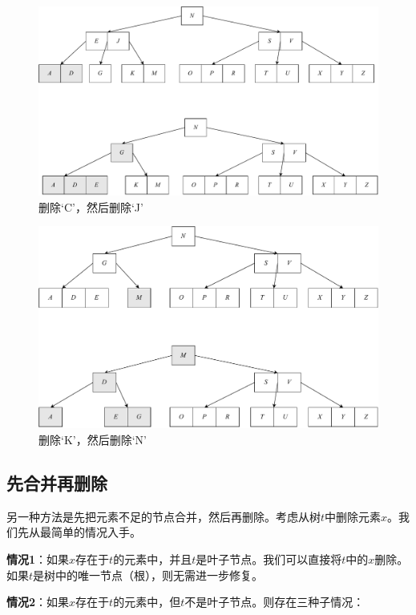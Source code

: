 \documentclass[b5paper]{ctexart}
\begin{document}
\begin{figure}[htbp]
  \centering
  \includegraphics[scale=0.33]{img/btree-del-CJ}
  \caption{删除`C'，然后删除`J'}
  \label{fig:btree-del-CJ}
\end{figure}

\begin{figure}[htbp]
  \centering
  \includegraphics[scale=0.33]{img/btree-del-KN}
  \caption{删除`K'，然后删除`N'}
  \label{fig:btree-del-KN}
\end{figure}

\subsection{先合并再删除}

另一种方法是先把元素不足的节点合并，然后再删除。考虑从树$t$中删除元素$x$。我们先从最简单的情况入手。

\textbf{情况1}：如果$x$存在于$t$的元素中，并且$t$是叶子节点。我们可以直接将$t$中的$x$删除。如果$t$是树中的唯一节点（根），则无需进一步修复。

\textbf{情况2}：如果$x$存在于$t$的元素中，但$t$不是叶子节点。则存在三种子情况：
\end{document}
